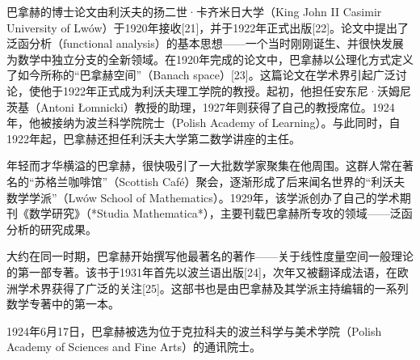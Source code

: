 巴拿赫的博士论文由利沃夫的扬二世·卡齐米日大学（King John II Casimir University of Lwów）于1920年接收[21]，并于1922年正式出版[22]。论文中提出了泛函分析（functional analysis）的基本思想——一个当时刚刚诞生、并很快发展为数学中独立分支的全新领域。在1920年完成的论文中，巴拿赫以公理化方式定义了如今所称的“巴拿赫空间”（Banach space）[23]。这篇论文在学术界引起广泛讨论，使他于1922年正式成为利沃夫理工学院的教授。起初，他担任安东尼·沃姆尼茨基（Antoni Łomnicki）教授的助理，1927年则获得了自己的教授席位。1924年，他被接纳为波兰科学院院士（Polish Academy of Learning）。与此同时，自1922年起，巴拿赫还担任利沃夫大学第二数学讲座的主任。

年轻而才华横溢的巴拿赫，很快吸引了一大批数学家聚集在他周围。这群人常在著名的“苏格兰咖啡馆”（Scottish Café）聚会，逐渐形成了后来闻名世界的“利沃夫数学学派”（Lwów School of Mathematics）。1929年，该学派创办了自己的学术期刊《数学研究》（*Studia Mathematica*），主要刊载巴拿赫所专攻的领域——泛函分析的研究成果。

大约在同一时期，巴拿赫开始撰写他最著名的著作——关于线性度量空间一般理论的第一部专著。该书于1931年首先以波兰语出版[24]，次年又被翻译成法语，在欧洲学术界获得了广泛的关注[25]。这部书也是由巴拿赫及其学派主持编辑的一系列数学专著中的第一本。

1924年6月17日，巴拿赫被选为位于克拉科夫的波兰科学与美术学院（Polish Academy of Sciences and Fine Arts）的通讯院士。
